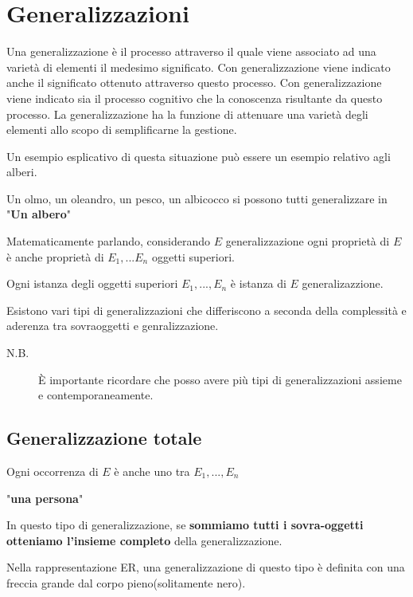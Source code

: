 \chapter{Generalizzazioni}

Una generalizzazione è il processo attraverso il quale viene associato ad una varietà di elementi il medesimo significato. Con generalizzazione viene indicato anche il significato ottenuto attraverso questo processo. Con generalizzazione viene indicato sia il processo cognitivo che la conoscenza risultante da questo processo. La generalizzazione ha la funzione di attenuare una varietà degli elementi allo scopo di semplificarne la gestione.

\begin{exmp}
Un esempio esplicativo di questa situazione può essere un esempio relativo agli alberi.

Un olmo, un oleandro, un pesco, un albicocco si possono tutti generalizzare in "\textbf{Un albero}"
\end{exmp}

Matematicamente parlando, considerando $E$ generalizzazione ogni proprietà di $E$ è anche proprietà di $E_1, ... E_n$ oggetti superiori.

Ogni istanza degli oggetti superiori $E_1, ..., E_n$ è istanza di $E$ generalizazzione.

Esistono vari tipi di generalizzazioni che differiscono a seconda della complessità e aderenza tra sovraoggetti e genralizzazione.

\begin{description}
	\item[N.B.] È importante ricordare che posso avere più tipi di generalizzazioni assieme e contemporaneamente.
\end{description}


\section{Generalizzazione totale}
Ogni occorrenza di $E$  è anche uno tra $E_1, ..., E_n$

\begin{exmp}
 "\textbf{una persona}"
\end{exmp}

In questo tipo di generalizzazione, se \textbf{sommiamo tutti i sovra-oggetti otteniamo l'insieme completo} della generalizzazione.

Nella rappresentazione ER, una generalizzazione di questo tipo è definita con una freccia grande dal corpo pieno(solitamente nero).

